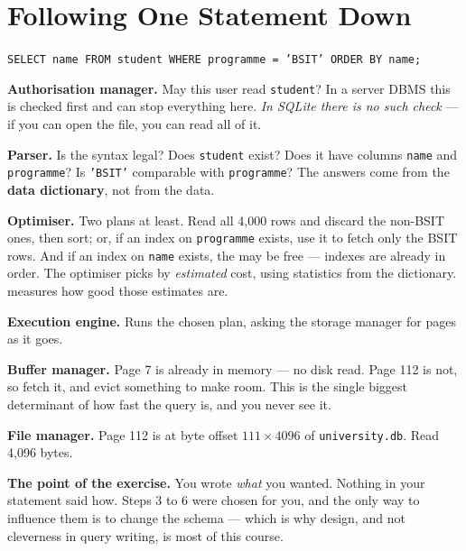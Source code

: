 \section{Following One Statement Down}

\begin{worked}
\texttt{SELECT name FROM student WHERE programme = 'BSIT' ORDER BY name;}

\begin{tightnum}
  \item \textbf{Authorisation manager.} May this user read
        \texttt{student}? In a server DBMS this is checked first and can stop
        everything here. \emph{In SQLite there is no such check} ---
        if you can open the file, you can read all of it.
  \item \textbf{Parser.} Is the syntax legal? Does \texttt{student} exist?
        Does it have columns \texttt{name} and \texttt{programme}? Is
        \texttt{'BSIT'} comparable with \texttt{programme}? The answers come
        from the \textbf{data dictionary}, not from the data.
  \item \textbf{Optimiser.} Two plans at least. Read all 4{,}000 rows and
        discard the non-BSIT ones, then sort; or, if an index on
        \texttt{programme} exists, use it to fetch only the BSIT rows. And if
        an index on \texttt{name} exists, the  may be free ---
        indexes are already in order. The optimiser picks by \emph{estimated}
        cost, using statistics from the dictionary.  measures
        how good those estimates are.
  \item \textbf{Execution engine.} Runs the chosen plan, asking the storage
        manager for pages as it goes.
  \item \textbf{Buffer manager.} Page 7 is already in memory --- no disk read.
        Page 112 is not, so fetch it, and evict something to make room. This
        is the single biggest determinant of how fast the query is, and you
        never see it.
  \item \textbf{File manager.} Page 112 is at byte offset $111 \times 4096$ of
        \texttt{university.db}. Read 4{,}096 bytes.
\end{tightnum}

\smallskip
\textbf{The point of the exercise.} You wrote \emph{what} you wanted. Nothing in
your statement said how. Steps 3 to 6 were chosen for you, and the only way to
influence them is to change the schema --- which is why design, and not
cleverness in query writing, is most of this course.
\end{worked}

